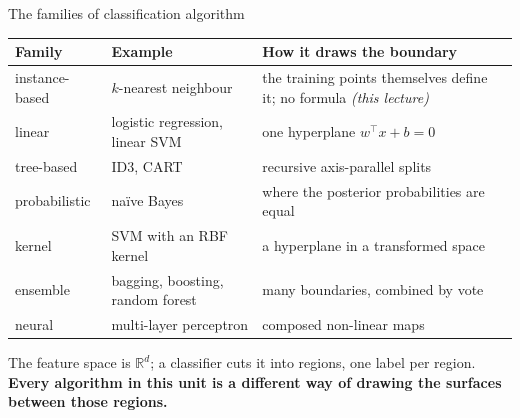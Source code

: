 \documentclass[aspectratio=169]{beamer}
\begin{document}
\begin{frame}[shrink=7]{The families of classification algorithm}
  \begin{center}\small
  \begin{tabular}{@{}llp{6.4cm}@{}}
    \toprule
    \textbf{Family} & \textbf{Example} & \textbf{How it draws the boundary}\\
    \midrule
    instance-based & $k$-nearest neighbour & the training points themselves
      define it; no formula \emph{(this lecture)}\\
    linear & logistic regression, linear SVM & one hyperplane
      $w^{\!\top}x + b = 0$\\
    tree-based & ID3, CART & recursive axis-parallel splits\\
    probabilistic & na\"ive Bayes & where the posterior probabilities are
      equal\\
    kernel & SVM with an RBF kernel & a hyperplane in a transformed space\\
    ensemble & bagging, boosting, random forest & many boundaries, combined
      by vote\\
    neural & multi-layer perceptron & composed non-linear maps\\
    \bottomrule
  \end{tabular}
  \end{center}
  \begin{center}\small
    The feature space is $\mathbb{R}^d$; a classifier cuts it into regions,
    one label per region. \textbf{Every algorithm in this unit is a different
    way of drawing the surfaces between those regions.}
  \end{center}
\end{frame}
\end{document}
